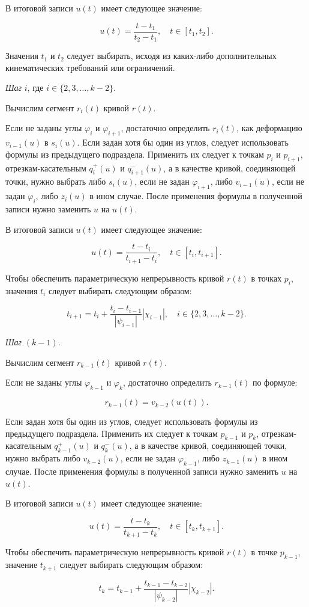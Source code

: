 В итоговой записи $u(t)$ имеет следующее значение:

$$
u(t)=\frac{t-t_1}{t_2-t_1}, \quad t \in [t_1,t_2].
$$

Значения $t_1$ и $t_2$ следует выбирать, исходя из каких-либо дополнительных кинематических требований или ограничений.

\bigskip
\textit{Шаг} $i$, где $i \in \{2,3,\dots,k-2\}$.

Вычислим сегмент $r_i(t)$ кривой $r(t)$.

Если не заданы углы $\varphi_i$ и $\varphi_{i+1}$, достаточно определить $r_i(t)$, как деформацию $v_{i-1}(u)$ в $s_i(u)$.
Если задан хотя бы один из углов, следует использовать формулы из предыдущего подраздела. Применить их следует к
точкам $p_i$ и $p_{i+1}$, отрезкам-касательным $q_i^+(u)$ и $q_{i+1}^-(u)$, а в качестве кривой, соединяющей точки,
нужно выбрать либо $s_i(u)$, если не задан $\varphi_{i+1}$, либо $v_{i-1}(u)$, если не задан $\varphi_i$, либо $z_i(u)$
в ином случае. После применения формулы в полученной записи нужно заменить $u$ на $u(t)$.

В итоговой записи $u(t)$ имеет следующее значение:

$$
u(t)=\frac{t-t_i}{t_{i+1}-t_i}, \quad t \in [t_i,t_{i+1}].
$$

Чтобы обеспечить параметрическую непрерывность кривой $r(t)$ в точках $p_i$, значения $t_i$ следует выбирать
следующим образом:

$$
t_{i+1}=t_i+\frac{t_i-t_{i-1}}{|\psi_{i-1}|}|\chi_{i-1}|, \quad i \in \{2,3,\dots,k-2\}.
$$

\bigskip
\textit{Шаг} $(k-1)$.

Вычислим сегмент $r_{k-1}(t)$ кривой $r(t)$.

Если не заданы углы $\varphi_{k-1}$ и $\varphi_k$, достаточно определить $r_{k-1}(t)$ по формуле:

$$
r_{k-1}(t)=v_{k-2}(u(t)).
$$

Если задан хотя бы один из углов, следует использовать формулы из предыдущего подраздела. Применить их следует к
точкам $p_{k-1}$ и $p_k$, отрезкам-касательным $q_{k-1}^+(u)$ и $q_k^-(u)$, а в качестве кривой, соединяющей точки,
нужно выбрать либо $v_{k-2}(u)$, если не задан $\varphi_{k-1}$, либо $z_{k-1}(u)$ в ином случае. После применения формулы
в полученной записи нужно заменить $u$ на $u(t)$.

В итоговой записи $u(t)$ имеет следующее значение:

$$
u(t)=\frac{t-t_k}{t_{k+1}-t_k}, \quad t \in [t_k,t_{k+1}].
$$

Чтобы обеспечить параметрическую непрерывность кривой $r(t)$ в точке $p_{k-1}$, значение $t_{k+1}$ следует выбирать
следующим образом:

$$
t_k=t_{k-1}+\frac{t_{k-1}-t_{k-2}}{|\psi_{k-2}|}|\chi_{k-2}|.
$$
